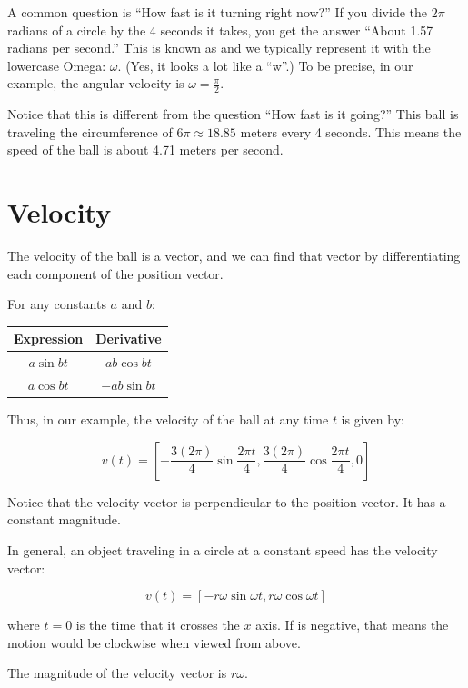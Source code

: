 A common question is ``How fast is it turning right now?''  If you
divide the $2\pi$ radians of a circle by the 4 seconds it takes, you
get the answer ``About 1.57 radians per second.''  This is known as
 and we typically represent it with the
lowercase Omega: $\omega$. (Yes, it looks a lot like a ``w''.)  To be
precise, in our example, the angular velocity is $\omega = \frac{\pi}{2}$.

Notice that this is different from the question ``How fast is it
going?''  This ball is traveling the circumference of $6\pi \approx
18.85$ meters every 4 seconds.  This means the speed of the ball is about
4.71 meters per second.

\section{Velocity}

The velocity of the ball is a vector, and we can find that vector by
differentiating each component of the position vector.

For any constants $a$ and $b$:

\begin{tabular}{c | c }
  Expression & Derivative \\
  \hline
  $a \sin{b t}$ & $ab \cos{b t}$ \\
  $a \cos{b t}$ & $-ab \sin{b t}$  \\
\end{tabular}

Thus, in our example, the velocity of the ball at any time $t$ is given by:

$$v(t) = \left[ -\frac{3 (2\pi)}{4} \sin{\frac{2\pi t}{4}}, \frac{3(2\pi)}{4} \cos{\frac{2\pi t}{4}}, 0 \right]$$

Notice that the velocity vector is perpendicular to the position vector.  It has a constant magnitude.

In general, an object traveling in a circle at a constant speed has the velocity vector:

$$v(t) = \left[ -r\omega \sin{\omega t}, r\omega \cos{\omega t}\right]$$

where $t = 0$ is the time that it crosses the $x$ axis.  If \omega is
negative, that means the motion would be clockwise when viewed from
above.

The magnitude of the velocity vector is $r\omega$. 


